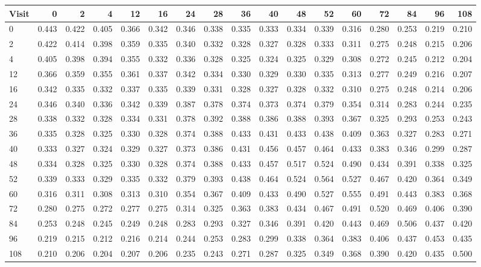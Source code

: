 \small
\begin{tabular}{lrrrrrrrrrrrrrrrr}
\hline
Visit & 0 & 2 & 4 & 12 & 16 & 24 & 28 & 36 & 40 & 48 & 52 & 60 & 72 & 84 & 96 & 108 \\
\hline
0 & 0.443 & 0.422 & 0.405 & 0.366 & 0.342 & 0.346 & 0.338 & 0.335 & 0.333 & 0.334 & 0.339 & 0.316 & 0.280 & 0.253 & 0.219 & 0.210 \\
2 & 0.422 & 0.414 & 0.398 & 0.359 & 0.335 & 0.340 & 0.332 & 0.328 & 0.327 & 0.328 & 0.333 & 0.311 & 0.275 & 0.248 & 0.215 & 0.206 \\
4 & 0.405 & 0.398 & 0.394 & 0.355 & 0.332 & 0.336 & 0.328 & 0.325 & 0.324 & 0.325 & 0.329 & 0.308 & 0.272 & 0.245 & 0.212 & 0.204 \\
12 & 0.366 & 0.359 & 0.355 & 0.361 & 0.337 & 0.342 & 0.334 & 0.330 & 0.329 & 0.330 & 0.335 & 0.313 & 0.277 & 0.249 & 0.216 & 0.207 \\
16 & 0.342 & 0.335 & 0.332 & 0.337 & 0.335 & 0.339 & 0.331 & 0.328 & 0.327 & 0.328 & 0.332 & 0.310 & 0.275 & 0.248 & 0.214 & 0.206 \\
24 & 0.346 & 0.340 & 0.336 & 0.342 & 0.339 & 0.387 & 0.378 & 0.374 & 0.373 & 0.374 & 0.379 & 0.354 & 0.314 & 0.283 & 0.244 & 0.235 \\
28 & 0.338 & 0.332 & 0.328 & 0.334 & 0.331 & 0.378 & 0.392 & 0.388 & 0.386 & 0.388 & 0.393 & 0.367 & 0.325 & 0.293 & 0.253 & 0.243 \\
36 & 0.335 & 0.328 & 0.325 & 0.330 & 0.328 & 0.374 & 0.388 & 0.433 & 0.431 & 0.433 & 0.438 & 0.409 & 0.363 & 0.327 & 0.283 & 0.271 \\
40 & 0.333 & 0.327 & 0.324 & 0.329 & 0.327 & 0.373 & 0.386 & 0.431 & 0.456 & 0.457 & 0.464 & 0.433 & 0.383 & 0.346 & 0.299 & 0.287 \\
48 & 0.334 & 0.328 & 0.325 & 0.330 & 0.328 & 0.374 & 0.388 & 0.433 & 0.457 & 0.517 & 0.524 & 0.490 & 0.434 & 0.391 & 0.338 & 0.325 \\
52 & 0.339 & 0.333 & 0.329 & 0.335 & 0.332 & 0.379 & 0.393 & 0.438 & 0.464 & 0.524 & 0.564 & 0.527 & 0.467 & 0.420 & 0.364 & 0.349 \\
60 & 0.316 & 0.311 & 0.308 & 0.313 & 0.310 & 0.354 & 0.367 & 0.409 & 0.433 & 0.490 & 0.527 & 0.555 & 0.491 & 0.443 & 0.383 & 0.368 \\
72 & 0.280 & 0.275 & 0.272 & 0.277 & 0.275 & 0.314 & 0.325 & 0.363 & 0.383 & 0.434 & 0.467 & 0.491 & 0.520 & 0.469 & 0.406 & 0.390 \\
84 & 0.253 & 0.248 & 0.245 & 0.249 & 0.248 & 0.283 & 0.293 & 0.327 & 0.346 & 0.391 & 0.420 & 0.443 & 0.469 & 0.506 & 0.437 & 0.420 \\
96 & 0.219 & 0.215 & 0.212 & 0.216 & 0.214 & 0.244 & 0.253 & 0.283 & 0.299 & 0.338 & 0.364 & 0.383 & 0.406 & 0.437 & 0.453 & 0.435 \\
108 & 0.210 & 0.206 & 0.204 & 0.207 & 0.206 & 0.235 & 0.243 & 0.271 & 0.287 & 0.325 & 0.349 & 0.368 & 0.390 & 0.420 & 0.435 & 0.500 \\
\hline
\end{tabular}
